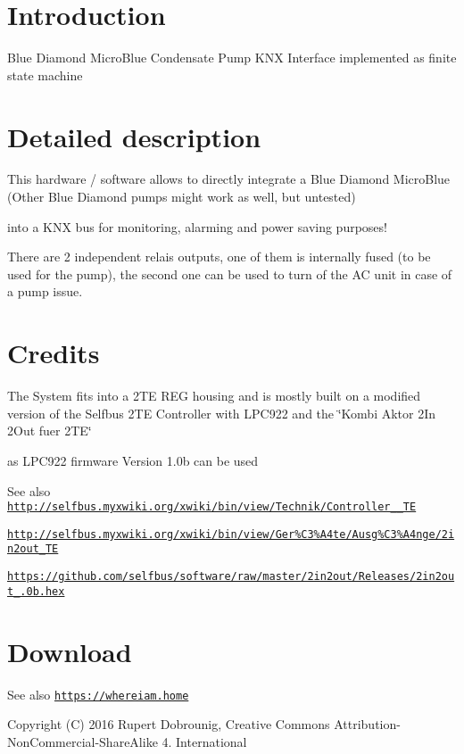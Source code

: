 \hypertarget{index_intro_sec}{}\section{Introduction}\label{index_intro_sec}
Blue Diamond Micro\-Blue Condensate Pump K\-N\-X Interface implemented as finite state machine \hypertarget{index_descript_sec}{}\section{Detailed description}\label{index_descript_sec}
This hardware / software allows to directly integrate a Blue Diamond Micro\-Blue (Other Blue Diamond pumps might work as well, but untested) \par
 into a K\-N\-X bus for monitoring, alarming and power saving purposes! \par
 There are 2 independent relais outputs, one of them is internally fused (to be used for the pump), the second one can be used to turn of the A\-C unit in case of a pump issue. \hypertarget{index_credit_sec}{}\section{Credits}\label{index_credit_sec}
The System fits into a 2\-T\-E R\-E\-G housing and is mostly built on a modified version of the Selfbus 2\-T\-E Controller with L\-P\-C922 and the \char`\"{}\-Kombi Aktor 2\-In 2\-Out fuer 2\-T\-E\char`\"{} \par
 as L\-P\-C922 firmware Version 1.\-0b can be used \begin{DoxySeeAlso}{See also}
\href{http://selfbus.myxwiki.org/xwiki/bin/view/Technik/Controller_922_2TE}{\tt http\-://selfbus.\-myxwiki.\-org/xwiki/bin/view/\-Technik/\-Controller\-\_\-\_\-T\-E} 

\href{http://selfbus.myxwiki.org/xwiki/bin/view/Ger%C3%A4te/Ausg%C3%A4nge/2in2out_2TE}{\tt http\-://selfbus.\-myxwiki.\-org/xwiki/bin/view/\-Ger\%\-C3\%\-A4te/\-Ausg\%\-C3\%\-A4nge/2in2out\-\_\-2\-T\-E} 

\href{https://github.com/selfbus/software/raw/master/2in2out/Releases/2in2out_1.0b.hex}{\tt https\-://github.\-com/selfbus/software/raw/master/2in2out/\-Releases/2in2out\-\_.\-0b.\-hex} 
\end{DoxySeeAlso}
\hypertarget{index_download_sec}{}\section{Download}\label{index_download_sec}
\begin{DoxySeeAlso}{See also}
\href{https://whereiam.home}{\tt https\-://whereiam.\-home} 
\end{DoxySeeAlso}
\begin{DoxyCopyright}{Copyright}
(C) 2016 Rupert Dobrounig, Creative Commons Attribution-\/\-Non\-Commercial-\/\-Share\-Alike 4. International 
\end{DoxyCopyright}
